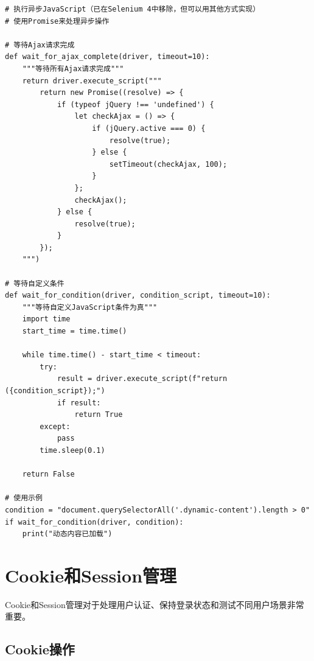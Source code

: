 \begin{lstlisting}[style=demostyle,numbers=none]
# 执行异步JavaScript（已在Selenium 4中移除，但可以用其他方式实现）
# 使用Promise来处理异步操作

# 等待Ajax请求完成
def wait_for_ajax_complete(driver, timeout=10):
    """等待所有Ajax请求完成"""
    return driver.execute_script("""
        return new Promise((resolve) => {
            if (typeof jQuery !== 'undefined') {
                let checkAjax = () => {
                    if (jQuery.active === 0) {
                        resolve(true);
                    } else {
                        setTimeout(checkAjax, 100);
                    }
                };
                checkAjax();
            } else {
                resolve(true);
            }
        });
    """)

# 等待自定义条件
def wait_for_condition(driver, condition_script, timeout=10):
    """等待自定义JavaScript条件为真"""
    import time
    start_time = time.time()
    
    while time.time() - start_time < timeout:
        try:
            result = driver.execute_script(f"return ({condition_script});")
            if result:
                return True
        except:
            pass
        time.sleep(0.1)
    
    return False

# 使用示例
condition = "document.querySelectorAll('.dynamic-content').length > 0"
if wait_for_condition(driver, condition):
    print("动态内容已加载")
\end{lstlisting}

\section{Cookie和Session管理}

Cookie和Session管理对于处理用户认证、保持登录状态和测试不同用户场景非常重要。

\subsection{Cookie操作}

